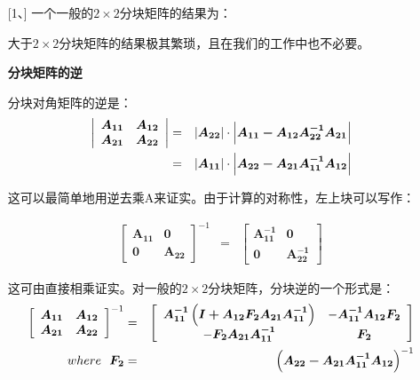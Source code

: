 \begin{enumerate} [1、]
		一个一般的$2 \times 2$分块矩阵的结果为：
	
		
		大于$2 \times 2$分块矩阵的结果极其繁琐，且在我们的工作中也不必要。
		
		{\bf 分块矩阵的逆}
		
		分块对角矩阵的逆是：
		 \vspace{-1em}
		\begin{eqnarray}
		\left|\begin{array}{cc}
		\boldsymbol{A_{11}} & \boldsymbol{A_{12}} \\
		\boldsymbol{A_{21}} & \boldsymbol{A_{22}}
		\end{array}\right|  & = & \left| \boldsymbol{A_{22}} \right| \cdot\left| \boldsymbol{A_{11}-A_{12} A_{22}^{-1} A_{21}} \right| \\
		& = & \left| \boldsymbol{ A_{11} } \right| \cdot\left| \boldsymbol{A_{22}-A_{21} A_{11}^{-1} A_{12}}\right| \notag
		\end{eqnarray}
		
		这可以最简单地用逆去乘A来证实。由于计算的对称性，左上块可以写作：
		
		\begin{eqnarray}
		\left[\begin{array}{cc}
			\boldsymbol{A_{11}} & \boldsymbol{0} \\
			\boldsymbol{0} & \boldsymbol{A_{22}}
		\end{array}\right]^{-1} & = & \left[
			\begin{array}{cc}
				\boldsymbol{A_{11}^{-1}} & \boldsymbol{0} \\
				\boldsymbol{0} & \boldsymbol{A_{22}^{-1}}
			\end{array}\right]
		\end{eqnarray}
		
		这可由直接相乘证实。对一般的$2 \times 2$分块矩阵，分块逆的一个形式是：
		\begin{eqnarray}
		\left[\begin{array}{cc}
			\boldsymbol{A_{11}} & \boldsymbol{A_{12}} \\
			\boldsymbol{A_{21}} & \boldsymbol{A_{22}}
		\end{array}\right]^{-1} & = & \left[\begin{array}{cc}
			\boldsymbol{A_{11}^{-1}} \left( \boldsymbol{ I+A_{12} F_{2} A_{21} A_{11}^{-1}} \right) & -\boldsymbol{ A_{11}^{-1} A_{12} F_{2}} \\
		-\boldsymbol{F_{2} A_{21} A_{11}^{-1}} & \boldsymbol{F_{2}} \\ 
		\end{array}\right]  \label{eq 2.1.14} \\
		where \ \ \boldsymbol{ F_{2} } & = & \left( \boldsymbol{ A_{22}-A_{21} A_{11}^{-1} A_{12}} \right)^{-1} \notag
		\end{eqnarray}
		

\end{enumerate}
